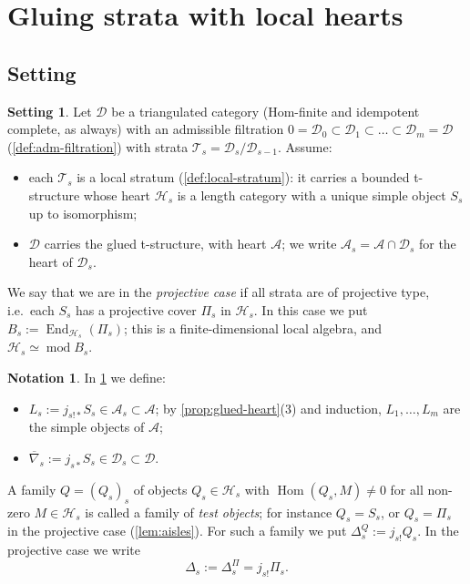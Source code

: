 \documentclass[11pt,reqno]{amsart}
\theoremstyle{plain}
\theoremstyle{definition}
\newtheorem{setting}[theorem]{Setting}
\newtheorem{notation}[theorem]{Notation}
\theoremstyle{remark}
\DeclareMathOperator{\Hom}{Hom}
\DeclareMathOperator{\End}{End}
\newcommand{\modd}{\operatorname{mod}}
\newcommand{\nablabar}{\overline{\nabla}}
\newcommand{\cD}{\mathcal{D}}
\newcommand{\cA}{\mathcal{A}}
\newcommand{\cH}{\mathcal{H}}
\newcommand{\cT}{\mathcal{T}}
\begin{document}
\section{Gluing strata with local hearts}\label{sec:gluing}

\subsection{Setting}

\begin{setting}\label{set:local}
Let $\cD$ be a triangulated category (Hom-finite and idempotent complete, as always) with an admissible filtration $0=\cD_0\subset\cD_1\subset\dots\subset\cD_m=\cD$ (\cref{def:adm-filtration}) with strata $\cT_s=\cD_s/\cD_{s-1}$. Assume:
\begin{itemize}
\item each $\cT_s$ is a local stratum (\cref{def:local-stratum}): it carries a bounded t-structure whose heart $\cH_s$ is a length category with a unique simple object $S_s$ up to isomorphism;
\item $\cD$ carries the glued t-structure, with heart $\cA$; we write $\cA_s=\cA\cap\cD_s$ for the heart of $\cD_s$.
\end{itemize}
We say that we are in the \emph{projective case} if all strata are of projective type, i.e.\ each $S_s$ has a projective cover $\Pi_s$ in $\cH_s$. In this case we put $B_s:=\End_{\cH_s}(\Pi_s)$; this is a finite-dimensional local algebra, and $\cH_s\simeq\modd B_s$.
\end{setting}

\begin{notation}\label{not:objects}
In \cref{set:local} we define:
\begin{itemize}
\item $L_s:=j_{s!*}S_s\in\cA_s\subset\cA$; by \cref{prop:glued-heart}(3) and induction, $L_1,\dots,L_m$ are the simple objects of $\cA$;
\item $\nablabar_s:=j_{s*}S_s\in\cD_s\subset\cD$.
\end{itemize}
A family $Q=(Q_s)_s$ of objects $Q_s\in\cH_s$ with $\Hom(Q_s,M)\ne0$ for all non-zero $M\in\cH_s$ is called a family of \emph{test objects}; for instance $Q_s=S_s$, or $Q_s=\Pi_s$ in the projective case (\cref{lem:aisles}). For such a family we put $\Delta^Q_s:=j_{s!}Q_s$. In the projective case we write
\[\Delta_s:=\Delta^\Pi_s=j_{s!}\Pi_s .\]
\end{notation}
\end{document}
